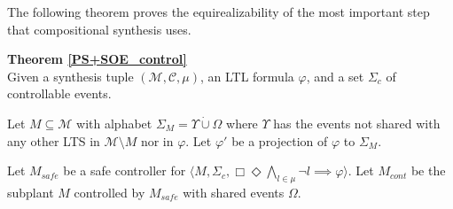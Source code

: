 \noindent
The following theorem proves the equirealizability of the most important step that compositional synthesis uses. 

\textbf{Theorem \ref{PS+SOE_control}}  \\
    Given a synthesis tuple $(\mathcal{M}, \mathcal{C}, \mu)$, an LTL formula $\varphi$, and a set $\Sigma_c$ of controllable events.
    
    Let $M \subseteq \mathcal{M}$ with alphabet $\Sigma_{M} = \Upsilon \dot{\cup} \Omega$ where $\Upsilon$ has the events not shared with any other LTS in $\mathcal{M}\setminus M$ nor in $\varphi$. Let $\varphi'$ be a projection of $\varphi$ to $\Sigma_{M}$. 


   
    Let $M_{safe}$ be a safe controller for $\langle M, \Sigma_c, \Box\Diamond\bigwedge_{l\in \mu}\neg l \implies \varphi \rangle$.  
    Let $M_{cont}$ be the subplant $M$ controlled by $M_{safe}$ with shared events $\Omega$.

